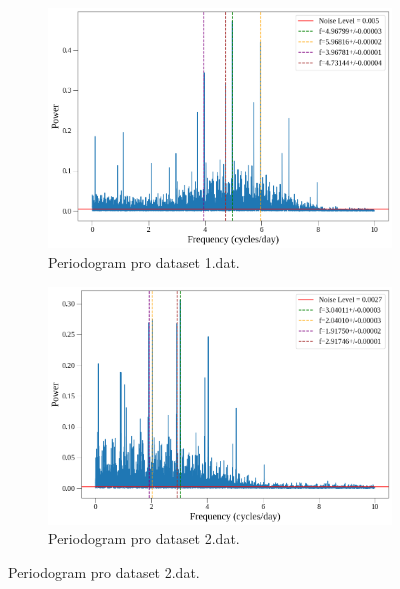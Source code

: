 \documentclass[a4paper,11pt,twocolumn]{article}
\begin{document}
            \begin{figure}%
                \centering
                \begin{subfigure}[t]{0.48\textwidth}
                    \centering
                    \includegraphics[width=\textwidth]{1_per.png}
                    \caption{Periodogram pro dataset 1.dat.}
                    \label{fig:1_per}
                \end{subfigure}
                \hfill
                \begin{subfigure}[t]{0.48\textwidth}
                    \centering
                    \includegraphics[width=\textwidth]{2_per.png}
                    \caption{Periodogram pro dataset 2.dat.}
                    \label{fig:2_per}
                \end{subfigure}
                \hfill

\end{figure}
\end{document}
